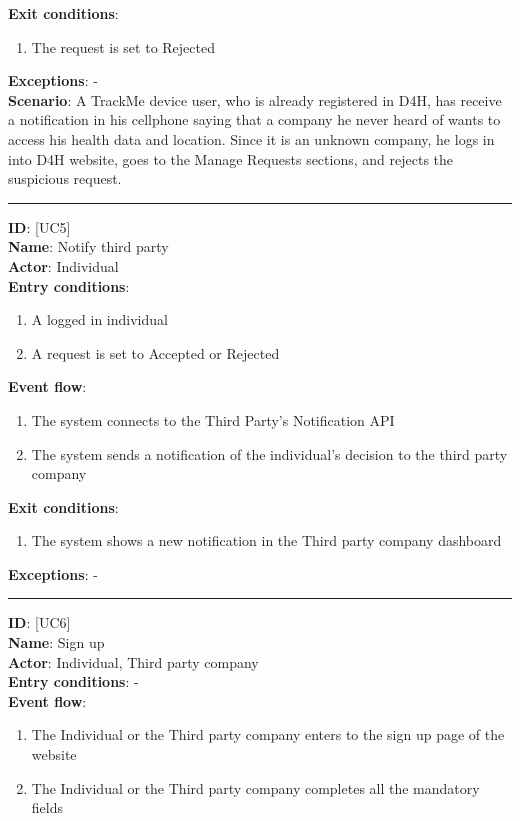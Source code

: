 \documentclass[a4paper, hidelinks, 12pt]{report}
\newcommand\usecase[1]{ [UC#1] }
\begin{document}
\begin{itemize}
\begin{enumerate}
		\end{enumerate}
		\textbf{Exit conditions}:
		\begin{enumerate}
			\item{The request is set to Rejected}
		\end{enumerate}
		\textbf{Exceptions}: - \\
		\textbf{Scenario}: A TrackMe device user, who is already registered in D4H, has receive a notification in his cellphone saying that a company he never heard of wants to access his health data and location. Since it is an unknown company, he logs in into D4H website, goes to the Manage Requests sections, and rejects the suspicious request. \\
		\rule{\linewidth}{0.4pt}
		\textbf{ID}: \usecase{5} \\
		\textbf{Name}: Notify third party \\
		\textbf{Actor}: Individual \\
		\textbf{Entry conditions}:
		\begin{enumerate}
			\item{A logged in individual}
			\item{A request is set to Accepted or Rejected}
		\end{enumerate}
		\textbf{Event flow}:
		\begin{enumerate}
			\item{The system connects to the Third Party's Notification API}
			\item{The system sends a notification of the individual's decision to the third party company}
		\end{enumerate}
		\textbf{Exit conditions}:
		\begin{enumerate}
			\item{The system shows a new notification in the Third party company dashboard}
		\end{enumerate}
		\textbf{Exceptions}: - \\
		\rule{\linewidth}{0.4pt}
		\textbf{ID}: \usecase{6} \\
		\textbf{Name}: Sign up \\
		\textbf{Actor}: Individual, Third party company \\
		\textbf{Entry conditions}: - \\
		\textbf{Event flow}:
		\begin{enumerate}
			\item{The Individual or the Third party company enters to the sign up page of the website}
			\item{The Individual or the Third party company completes all the mandatory fields}

\end{enumerate}
\end{itemize}
\end{document}
